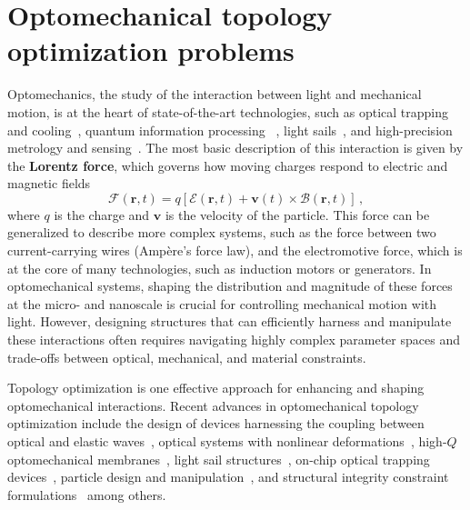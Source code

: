 \chapter{Optomechanical topology optimization problems}\label{chap:om}
Optomechanics, the study of the interaction between light and mechanical motion, is at the heart of state-of-the-art technologies, such as 
optical trapping~\cite{ashkin_acceleration_1970, moffitt_recent_2008} and cooling~\cite{cooling}, quantum information processing~\cite{Andrews_2014, Xi_2025}
, light sails~\cite{lightsail, lightsail1}, and high-precision metrology and sensing~\cite{sensing, weakforce, Li:18, Mason_2019}. The most basic description of this interaction is given by the \textbf{Lorentz force}, which governs how moving charges respond to electric and magnetic fields
\begin{equation}\label{eq:lorentz_f}
 \mathbf{\bm{\mathcal{F}}}(\mathbf{r},t) = q \left[ \bm{\mathcal{E}}(\mathbf{r},t) + \mathbf{v}(t) \times \bm{\mathcal{B}}(\mathbf{r},t) \right]\,,
\end{equation}
where $q$ is the charge and $\mathbf{v}$ is the velocity of the particle. This force can be generalized to describe more complex systems,
such as the force between two current-carrying 
wires (Ampère's force law), and the electromotive force, which is at the core of many technologies, such as induction motors or generators.
In optomechanical systems, shaping the distribution and magnitude of these forces at the micro- and nanoscale is crucial for controlling mechanical motion with light. 
However, designing structures that can efficiently harness and manipulate these interactions often requires navigating highly complex
 parameter spaces and trade-offs between optical, mechanical, and material constraints.

 Topology optimization is one effective approach for enhancing and shaping optomechanical interactions.
Recent advances in optomechanical topology optimization include the design of devices harnessing the coupling between optical and elastic
 waves~\cite{photo_topopt}, optical systems with nonlinear deformations~\cite{def_wg}, high-$Q$ optomechanical membranes~\cite{highQ1, fengwen, aragon1},
light sail structures~\cite{lightsail_topopt, lightsail_topopt1},
on-chip optical trapping devices~\cite{ownpub1}, particle design and manipulation~\cite{ownpub2, particle_opt},
and structural integrity constraint formulations~\cite{structural_integrity}
 among others.


